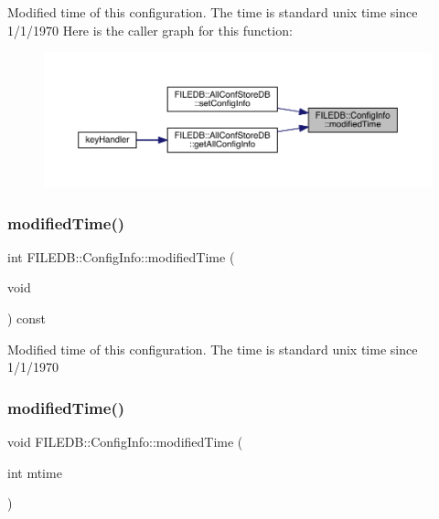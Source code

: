 Modified time of this configuration. The time is standard unix time since 1/1/1970 Here is the caller graph for this function\+:\nopagebreak
\begin{figure}[H]
\begin{center}
\leavevmode
\includegraphics[width=350pt]{d0/d90/classFILEDB_1_1ConfigInfo_a03212f15d26edbae21ea53bbce2b1793_icgraph}
\end{center}
\end{figure}
\mbox{\label{classFILEDB_1_1ConfigInfo_a03212f15d26edbae21ea53bbce2b1793}} 
\subsubsection{\texorpdfstring{modifiedTime()}{modifiedTime()}\hspace{0.1cm}{\footnotesize\ttfamily [2/4]}}
{\footnotesize\ttfamily int F\+I\+L\+E\+D\+B\+::\+Config\+Info\+::modified\+Time (\begin{DoxyParamCaption}\item[{void}]{ }\end{DoxyParamCaption}) const}

Modified time of this configuration. The time is standard unix time since 1/1/1970 \mbox{\label{classFILEDB_1_1ConfigInfo_a5c250fc2d94faafa05f18d8126ccf0cb}} 
\subsubsection{\texorpdfstring{modifiedTime()}{modifiedTime()}\hspace{0.1cm}{\footnotesize\ttfamily [3/4]}}
{\footnotesize\ttfamily void F\+I\+L\+E\+D\+B\+::\+Config\+Info\+::modified\+Time (\begin{DoxyParamCaption}\item[{int}]{mtime }\end{DoxyParamCaption})}


